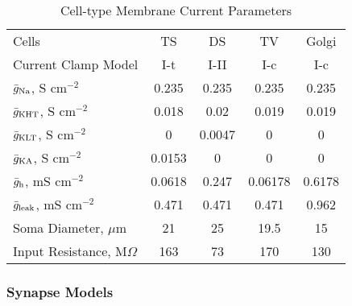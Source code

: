 \begin{table}[tp]
  \centering
  \caption{Cell-type Membrane Current Parameters}\label{tab:GA:CellTypes}
  \begin{tabularx}{0.8\linewidth}{lcccc}\hline
                Cells                 &   TS   &   DS   &   TV    & Golgi \\ %
         Current Clamp Model          &  I-t   &  I-II  &   I-c   & I-c \\[0.5ex] \hline
 $\bar{g}_{{\rm Na}} $, S cm$^{-2}$   & 0.235  & 0.235  &  0.235  & 0.235 \\ %
 $\bar{g}_{{\rm KHT}} $, S cm$^{-2}$  & 0.018  &  0.02  &  0.019  & 0.019 \\ %
$\bar{g}_{{\rm  KLT}} $, S cm$^{-2}$  &   0    & 0.0047 &    0    & 0 \\ %
 $\bar{g}_{{\rm KA}} $, S cm$^{-2}$   & 0.0153 &   0    &    0    & 0 \\ %
 $\bar{g}_{{\rm h}} $, mS cm$^{-2}$   & 0.0618 & 0.247  & 0.06178 & 0.6178 \\ %
$\bar{g}_{{\rm leak}} $, mS cm$^{-2}$ & 0.471  & 0.471  &  0.471  & 0.962 \\ %
        Soma Diameter, $\mu$m         &   21   &   25   &  19.5   & 15 \\ %
    Input Resistance, M$\Omega $      &  163   &   73   &   170   & 130 \\ \hline
\end{tabularx}
\end{table}



\subsubsection{Synapse Models}

